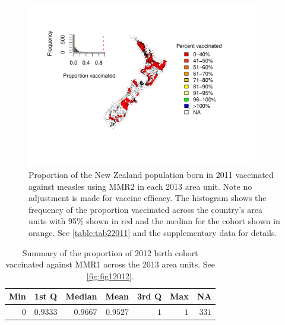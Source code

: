 \documentclass{article}
\begin{document}
\begin{figure}
\begin{center}
    \includegraphics[width=0.9\textwidth]{nir_census_MMR2_NIR_2011.pdf}
 \end{center}
    \caption{Proportion of the New Zealand population born in 2011 vaccinated against measles using MMR2 in each 2013 area unit. Note no adjustment is made for vaccine efficacy. The histogram shows the frequency of the proportion vaccinated across the country's area units with 95\% shown in red and the median for the cohort shown in orange. See \autoref{table:tab22011} and the supplementary data for details.}
\label{fig:fig22011}
\end{figure}

 \vspace{5mm} %
\begin{table}
\begin{center}
\begin{tabular}{rrrrrrr}
\hline\hline
\multicolumn{1}{c}{Min}&\multicolumn{1}{c}{1st Q}&\multicolumn{1}{c}{Median}&\multicolumn{1}{c}{Mean}&\multicolumn{1}{c}{3rd Q}&\multicolumn{1}{c}{Max}&\multicolumn{1}{c}{NA}\tabularnewline
\hline
$0$&$0.9333$&$0.9667$&$0.9527$&$1$&$1$&$331$\tabularnewline
\hline
\end{tabular}\end{center}\caption{Summary of the proportion of 2012 birth cohort vaccinated against MMR1 across the 2013 area units. See \autoref{fig:fig12012}.}
\label{table:tab12012}
\end{table}
\end{document}
